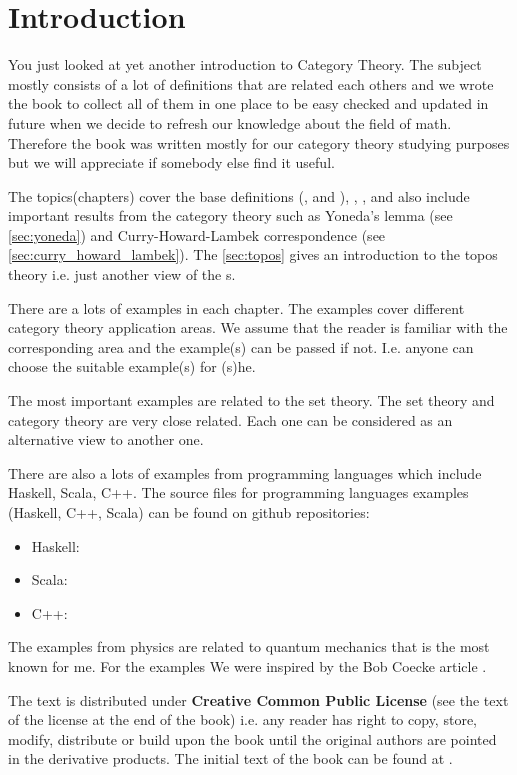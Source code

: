 \chapter*{Introduction}

You just looked at yet another introduction to Category Theory. The
subject mostly consists of a lot of definitions that are related each
others and we wrote the book to collect all of them in one
place to be easy checked and updated in future when we decide to refresh
our knowledge about the field of math. Therefore the book was written mostly
for our category theory studying purposes but we will appreciate if
somebody else find it useful. 

The topics(chapters) cover the base definitions
(,  and
), ,
,  and also include important
results from the category theory such as Yoneda's lemma (see
\cref{sec:yoneda}) and Curry-Howard-Lambek correspondence (see
\cref{sec:curry_howard_lambek}). The \cref{sec:topos} gives an
introduction to the topos theory i.e. just another view of the
s.

There are a lots of examples in each chapter. The examples cover different category
theory application areas. We assume that the reader is familiar with
the corresponding area and the example(s) can be passed if not. I.e.
anyone can choose the suitable example(s) for (s)he. 

The most important examples are related to the set theory. The set
theory and category theory are very close related. Each one can be
considered as an alternative view to another one.

There are also a lots of examples from programming languages which include
Haskell, Scala, C++. The source files for programming languages 
examples (Haskell, C++, Scala) can be found on github repositories:
\begin{itemize}
\item Haskell: \cite{github:cattheory_hs_examples}
\item Scala: \cite{github:cattheory_scala_examples}
\item C++: \cite{github:cattheory_cpp_examples}
\end{itemize}

The examples from physics are related to quantum mechanics that is the
most known for me. For the examples We were inspired by the Bob Coecke
article \cite{bib:arxiv:Bob_Coecke_2008}.

The text is distributed under \textbf{Creative Common Public License}
(see the text of the license at the end of the book)
i.e. any reader has right to copy, store, modify, distribute or build
upon the book until the original authors are pointed in the derivative
products. The initial text of the book can be found at
\cite{github:cattheory_ivanmurashko}.  
